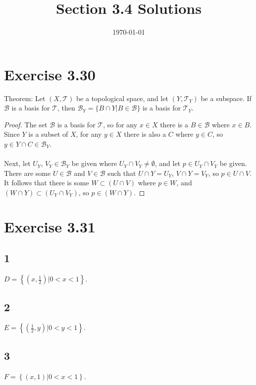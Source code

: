 \documentclass{article}
\title{\textbf{Section 3.4 Solutions}}
\date{}
\date\today
\begin{document}
\maketitle %

\thispagestyle{firstpage}
\section*{Exercise 3.30}

Theorem: Let $(X, \mathcal{T})$ be a topological space, and let $(Y, \mathcal{T}_Y)$ be a subspace.  If $\mathcal{B}$ is a 
basis for $\mathcal{T}$, then $\mathcal{B}_Y = \{B \cap Y | B \in \mathcal{B} \}$ is a basis for $\mathcal{T}_Y$.

\begin{proof}
  The set $\mathcal{B}$ is a basis for $\mathcal{T}$, so for any $x \in X$ there is a $B \in \mathcal{B}$ where $x \in B$.  Since $Y$ is a subset of 
  $X$, for any $y \in X$ there is also a $C$ where $y \in C$, so $y \in Y \cap C \in \mathcal{B}_Y$. \\ 
  \\ 
  Next, let $U_Y$, $V_Y \in \mathcal{B}_Y$ be given where $U_Y \cap V_Y \neq \emptyset$, and let $p \in U_Y \cap V_Y$ be given.  There are some $U \in \mathcal{B}$ 
  and $V \in \mathcal{B}$ such that $U \cap Y = U_Y$, $V \cap Y = V_Y$, so $p \in U \cap V$.  It follows that there is some $W \subset (U \cap V)$ where $p \in W$, 
  and $(W \cap Y) \subset (U_Y \cap V_Y)$, so $p \in (W \cap Y)$.
\end{proof}

\section*{Exercise 3.31} 

\subsection*{1} 
$D = \left\lbrace \left( x, \frac{1}{2}\right) | 0 < x < 1 \right\rbrace$. 



\subsection*{2} 
$E = \left\lbrace \left( \frac{1}{2}, y\right) | 0 < y < 1 \right\rbrace$. 



\subsection*{3} 
$F = \left\lbrace \left( x, 1 \right) | 0 < x < 1 \right\rbrace$. 
\end{document}
